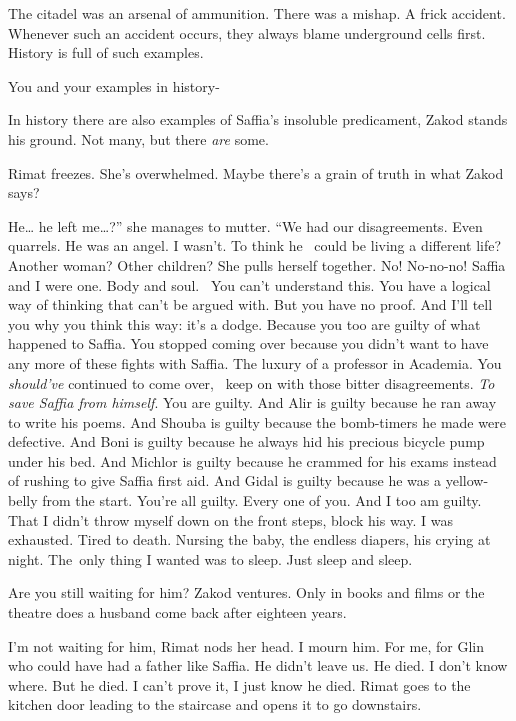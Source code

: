 \documentclass[letterpaper]{article}
\begin{document}
{\textquotedbl}The citadel was an arsenal of ammunition. There was a mishap. A frick accident. Whenever such an accident
occurs, they always blame underground cells first. History is full of such examples.{\textquotedbl} 

{\textquotedbl}You and your examples in history-{\textquotedbl} 

{\textquotedbl}In history there are also examples of Saffia's insoluble predicament,{\textquotedbl} Zakod stands his
ground. {\textquotedbl}Not many, but there \textit{are} some.{\textquotedbl}

Rimat freezes. She's overwhelmed. Maybe there's a grain of truth in what Zakod says? \ 

{\textquotedbl}He{\dots} he left me{\dots}?'' she manages to mutter. ``We had our disagreements. Even quarrels. He was
an angel. I wasn't. To think he \ could be living a different life? Another woman? Other children?{\textquotedbl} She
pulls herself together. {\textquotedbl}No! No-no-no! Saffia and I were one. Body and soul.~ You can't understand this.
You have a logical way of thinking that can't be argued with. But you have no proof. And I'll tell you why you think
this way: it's a dodge. Because you too are guilty of what happened to Saffia. You stopped coming over because you
didn't want to have any more of these fights with Saffia. The luxury of a professor in Academia. You \textit{should've}
continued to come over, \ keep on with those bitter disagreements. \textit{To save Saffia from himself}. You are
guilty. And Alir is guilty because he ran away to write his poems. And Shouba is guilty because the bomb-timers he made
were defective. And Boni is guilty because he always hid his precious bicycle pump under his bed. And Michlor is guilty
because he crammed for his exams instead of rushing to give Saffia first aid. And Gidal is guilty because he was a
yellow-belly from the start. You're all guilty. Every one of you. And I too am guilty. That I didn't throw myself down
on the front steps, block his way. I was exhausted. Tired to death. Nursing the baby, the endless diapers, his crying
at night. The~only thing I wanted was to sleep. Just sleep and sleep.{\textquotedbl} 

{\textquotedbl}Are you still waiting for him?{\textquotedbl} Zakod ventures. {\textquotedbl}Only in books and films or
the theatre does a husband come back after eighteen years.{\textquotedbl}

{\textquotedbl}I'm not waiting for him,{\textquotedbl} Rimat nods her head. {\textquotedbl}I mourn him. For me, for Glin
who could have had a father like Saffia. He didn't leave us. He died. I don't know where. But he died. I can't prove
it, I just know he died.{\textquotedbl} Rimat goes to the kitchen door leading to the staircase and opens it to go
downstairs. 
\end{document}
